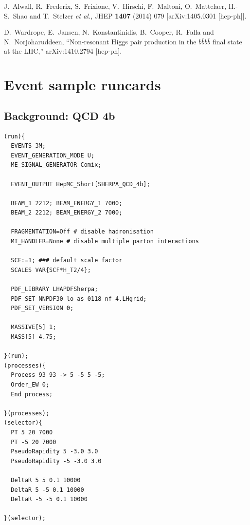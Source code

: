 \documentclass[12pt]{article}
\def\Acknowledgements{\bigskip  \bigskip \begin{center} \begin{large}
             \bf ACKNOWLEDGEMENTS \end{large}\end{center}}
\begin{document}


\begin{thebibliography}{1}

  J.~Alwall, R.~Frederix, S.~Frixione, V.~Hirschi, F.~Maltoni, O.~Mattelaer, H.-S.~Shao and T.~Stelzer {\it et al.},
  JHEP {\bf 1407} (2014) 079
  [arXiv:1405.0301 [hep-ph]].

  D.~Wardrope, E.~Jansen, N.~Konstantinidis, B.~Cooper, R.~Falla and N.~Norjoharuddeen,
  ``Non-resonant Higgs pair production in the $b\overline{b}b\overline{b}$ final state at the LHC,''
  arXiv:1410.2794 [hep-ph].


  \end{thebibliography}


\clearpage
\appendix
\section{Event sample runcards}
\label{app:runcards}
\subsection {Background: QCD 4b}
\begin{verbatim}
(run){
  EVENTS 3M;
  EVENT_GENERATION_MODE U;
  ME_SIGNAL_GENERATOR Comix;

  EVENT_OUTPUT HepMC_Short[SHERPA_QCD_4b];

  BEAM_1 2212; BEAM_ENERGY_1 7000;
  BEAM_2 2212; BEAM_ENERGY_2 7000;

  FRAGMENTATION=Off # disable hadronisation
  MI_HANDLER=None # disable multiple parton interactions

  SCF:=1; ### default scale factor
  SCALES VAR{SCF*H_T2/4};

  PDF_LIBRARY LHAPDFSherpa;
  PDF_SET NNPDF30_lo_as_0118_nf_4.LHgrid;
  PDF_SET_VERSION 0;

  MASSIVE[5] 1;
  MASS[5] 4.75;

}(run);
(processes){
  Process 93 93 -> 5 -5 5 -5;
  Order_EW 0;
  End process;

}(processes);
(selector){
  PT 5 20 7000
  PT -5 20 7000
  PseudoRapidity 5 -3.0 3.0
  PseudoRapidity -5 -3.0 3.0

  DeltaR 5 5 0.1 10000
  DeltaR 5 -5 0.1 10000
  DeltaR -5 -5 0.1 10000

}(selector);
\end{verbatim}
\end{document}
